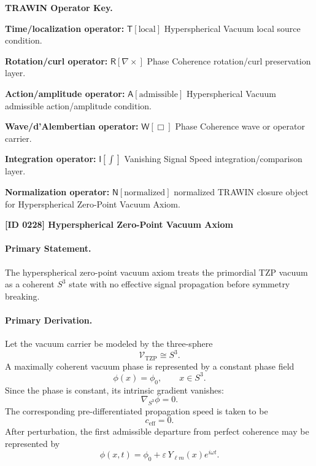 \par\vspace{0.45\baselineskip}
\noindent\begin{minipage}[t]{\linewidth}
\begingroup
\small
\raggedright
\textbf{TRAWIN Operator Key.}\par
\noindent\textbf{Time/localization operator:} $\mathsf{T}\!\left[\mathrm{local}\right]$ Hyperspherical Vacuum local source condition.\par
\noindent\textbf{Rotation/curl operator:} $\mathsf{R}\!\left[\nabla\times\right]$ Phase Coherence rotation/curl preservation layer.\par
\noindent\textbf{Action/amplitude operator:} $\mathsf{A}\!\left[\mathrm{admissible}\right]$ Hyperspherical Vacuum admissible action/amplitude condition.\par
\noindent\textbf{Wave/d'Alembertian operator:} $\mathsf{W}\!\left[\Box\right]$ Phase Coherence wave or operator carrier.\par
\noindent\textbf{Integration operator:} $\mathsf{I}\!\left[\int\right]$ Vanishing Signal Speed integration/comparison layer.\par
\noindent\textbf{Normalization operator:} $\mathsf{N}\!\left[\mathrm{normalized}\right]$ normalized TRAWIN closure object for Hyperspherical Zero-Point Vacuum Axiom.\par
\endgroup
\end{minipage}

\clearpage
\noindent\textbf{[ID 0228] Hyperspherical Zero-Point Vacuum Axiom}\par
\vspace{0.35em}
\paragraph{Primary Statement.}

The hyperspherical zero-point vacuum axiom treats the primordial TZP vacuum as a coherent \(S^3\) state with no effective signal propagation before symmetry breaking.

\paragraph{Primary Derivation.}

Let the vacuum carrier be modeled by the three-sphere
\[
\mathcal{V}_{\mathrm{TZP}}\cong S^3.
\]
A maximally coherent vacuum phase is represented by a constant phase field
\[
\phi(x)=\phi_0,\qquad x\in S^3.
\]
Since the phase is constant, its intrinsic gradient vanishes:
\[
\nabla_{S^3}\phi=0.
\]
The corresponding pre-differentiated propagation speed is taken to be
\[
c_{\mathrm{eff}}=0.
\]
After perturbation, the first admissible departure from perfect coherence may be represented by
\[
\phi(x,t)=\phi_0+\varepsilon\,Y_{\ell m}(x)e^{i\omega t}.
\]

